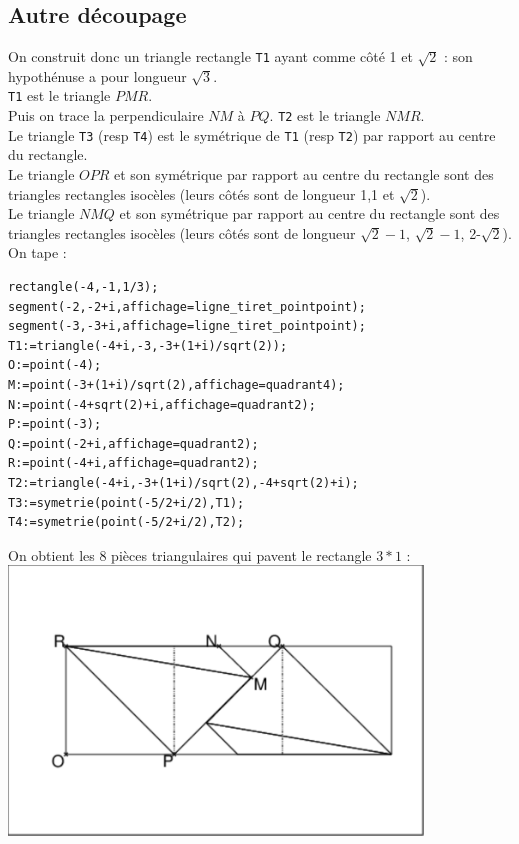 \documentclass[a4paper,11pt]{book}
\begin{document}
\subsection{Autre d\'ecoupage}
On construit donc un triangle rectangle {\tt T1} ayant comme c\^ot\'e 1 et 
$\sqrt 2$ : son hypoth\'enuse a pour longueur $\sqrt 3$.\\
{\tt T1} est le triangle $PMR$.\\
Puis on trace la perpendiculaire $NM$ \`a $PQ$.
{\tt T2} est le triangle $NMR$.\\
Le triangle {\tt T3} (resp {\tt T4}) est le sym\'etrique de {\tt T1} (resp 
{\tt T2}) par rapport au centre du rectangle.\\
Le triangle $OPR$ et son sym\'etrique  par rapport au centre du rectangle sont 
des triangles rectangles isoc\`eles (leurs c\^ot\'es sont de longueur 1,1 et 
$\sqrt 2$).\\
Le triangle $NMQ$ et son sym\'etrique  par rapport au centre du rectangle sont 
des triangles rectangles isoc\`eles (leurs  c\^ot\'es sont de longueur  
$\sqrt 2 -1$, $\sqrt 2 -1$, 2-$\sqrt 2$).\\
On tape :
\begin{verbatim}
rectangle(-4,-1,1/3);
segment(-2,-2+i,affichage=ligne_tiret_pointpoint);
segment(-3,-3+i,affichage=ligne_tiret_pointpoint);
T1:=triangle(-4+i,-3,-3+(1+i)/sqrt(2));
O:=point(-4);
M:=point(-3+(1+i)/sqrt(2),affichage=quadrant4);
N:=point(-4+sqrt(2)+i,affichage=quadrant2);
P:=point(-3);
Q:=point(-2+i,affichage=quadrant2);
R:=point(-4+i,affichage=quadrant2);
T2:=triangle(-4+i,-3+(1+i)/sqrt(2),-4+sqrt(2)+i);
T3:=symetrie(point(-5/2+i/2),T1);
T4:=symetrie(point(-5/2+i/2),T2);
\end{verbatim}
On obtient les 8 pi\`eces triangulaires qui pavent le rectangle $3*1$  :\\
\includegraphics[width=11cm]{carresqrt}\\
\end{document}
